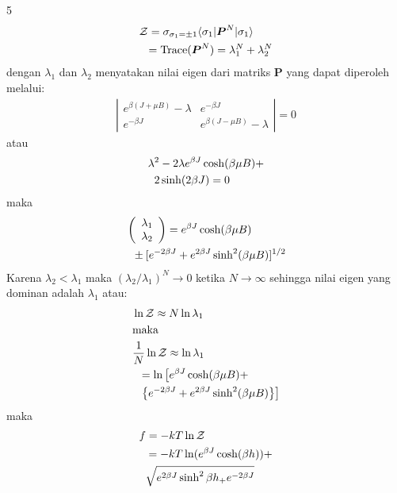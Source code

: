 \documentclass[a4paper  , 6 pt]{article}
\begin{document}
\begin{tiny}
\begin{multicols} {5}
\begin{align}
& \mathcal{Z} = \sigma_{\sigma_1 = \pm 1} \langle \sigma_1  \lvert \boldsymbol{P}^N \lvert \sigma_1 \rangle \nonumber \\ 
& \hspace{ 0.2 cm}  =  \boldsymbol{\text{Trace}} (\boldsymbol{P}^N)  = \lambda_1^N + \lambda_2^N   
\end{align}
dengan $\lambda_1$ dan $\lambda_2$ menyatakan nilai eigen dari matriks $\boldsymbol{P}$ yang dapat diperoleh melalui:
\begin{align}
\left \lvert 
\begin{array}{ll}
e^{\beta(J + \mu B)} - \lambda  & e^{- \beta J} \\
e^{- \beta J} & e^{\beta (J - \mu B)} - \lambda
\end{array}
 \right \lvert  = 0
\end{align}
atau 
\begin{align}
& \lambda^2 - 2 \lambda e^{\beta J} \cosh (\beta \mu B) + \nonumber \\ & \hspace{ 0.2 cm}  2 \sinh (2 \beta J) = 0 
\end{align}
maka 
\begin{align}
& \left( 
\begin{array}{l}
\lambda_1 \\
\lambda_2 
\end{array}
\right)
 = e^{\beta J} \cosh (\beta \mu B) \nonumber \\ & \hspace{ 0.2 cm} \pm [e^{- 2 \beta J} + e^{2 \beta J} \sinh^2 (\beta \mu B)]^{1/2}
\end{align}
 Karena $\lambda_2 < \lambda_1$ maka $(\lambda_2 /\lambda_1)^N \rightarrow 0$ ketika $N \rightarrow \infty$ sehingga nilai eigen yang dominan adalah $\lambda_1$ atau:
 \begin{align}
&  \ln \mathcal{Z}  \approx N \ln \lambda_1 \nonumber \\ 
& \text{maka} \nonumber \\
&  \frac{1}{N} \ln \mathcal{Z} \approx \ln \lambda_1 \nonumber \\
 & \hspace{ 0.2 cm} = \ln \left[ e^{\beta J} \cosh (\beta \mu B) + \right. \nonumber \\ & \hspace{ 0.2 cm} \left. \left \lbrace e^{ - 2 \beta J} + e^{2 \beta J} \sinh^2 (\beta \mu B) \right \rbrace\right] 
 \end{align}
 maka 
  \begin{align}
  & f  = - kT \ln \mathcal{Z} \nonumber \\ 
 & \hspace{ 0.2 cm} =  - kT \ln (e^{\beta J} \cosh (\beta h ))
   + \nonumber \\ 
   & \hspace{ 0.2 cm}  \sqrt{e^{2 \beta J} \sinh^2 \beta h _+ e^{- 2 \beta J}}
  \end{align} 
  \end{multicols}
\end{tiny}
\end{document}
